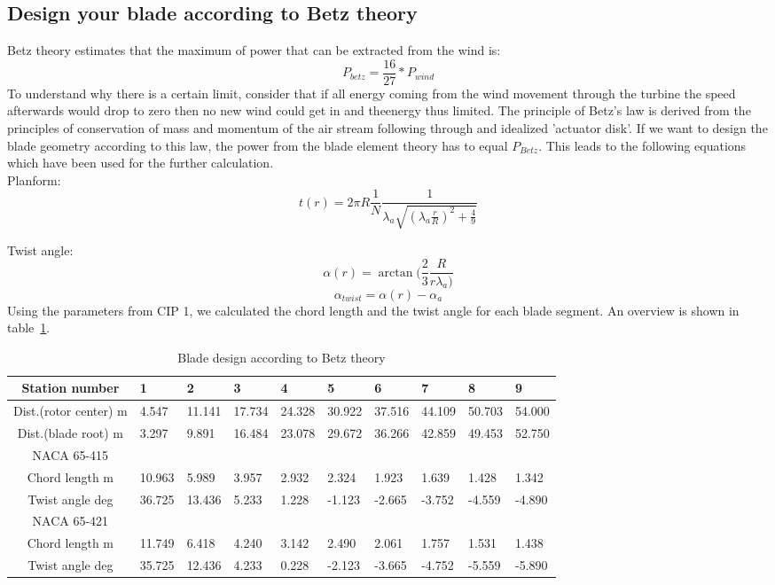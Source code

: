 \documentclass[10pt]{article}
\begin{document}
\subsection{Design your blade according to Betz theory}
Betz theory estimates that the maximum of power that can be extracted from the wind is:
\begin{equation}
P_{betz} = \frac{16}{27}*P_{wind}
\end{equation}
To understand why there is a certain limit, consider that if all energy coming from the wind movement through the turbine the speed afterwards would drop to zero then no new wind could get in and theenergy thus limited.
The principle of Betz's law is derived from the principles of conservation of mass and momentum of the air stream following through and idealized 'actuator disk'.
If we want to design the blade geometry according to this law, the power from the blade element theory has to equal $P_{Betz}$. This leads to the following equations which have been used for the further calculation.\\

Planform:
\begin{equation}
t(r) = 2\pi R \frac{1}{N}\frac{1}{\lambda_a\sqrt{(\lambda_a\frac{r}{R})^2+\frac{4}{9}}}
\end{equation}

Twist angle:
\begin{equation}
\alpha(r) = \arctan(\frac{2}{3}\frac{R}{r\lambda_a)}
\end{equation}
\begin{equation}
\alpha_{twist} = \alpha(r) - \alpha_a
\end{equation}
Using the parameters from CIP 1, we calculated the chord length and the twist angle for each blade segment. An overview is shown in table~\ref{blade_design_betz}.
\begin{table}[H]
\begin{tabular}{c| l l l l l l l l l}
\hline
Station number & 	1&	2&	3	&4	&5	&6	&7	&8	&9\\
\hline
Dist.(rotor center)	m&	4.547&	11.141&	17.734&	24.328&	30.922&	37.516&	44.109&	50.703&	54.000\\
Dist.(blade root)	m&	3.297&	9.891&	16.484&	23.078&	29.672&	36.266&	42.859&	49.453&	52.750\\
\hline
NACA 65-415\\
\hline
Chord length	m&		10.963&	5.989&	3.957&	2.932	&2.324&	1.923&	1.639&	1.428&	1.342\\
Twist angle	deg	&	36.725	&13.436&	5.233&	1.228&	-1.123&	-2.665&	-3.752	&-4.559&	-4.890\\
\hline
NACA 65-421\\
\hline
Chord length	m	&	11.749&	6.418	&4.240&	3.142&	2.490&	2.061	&1.757&	1.531&	1.438
\\
Twist angle	deg	&	35.725&	12.436&	4.233&	0.228	&-2.123&	-3.665	&-4.752&	-5.559	&-5.890\\
\hline
\end{tabular}
\caption{Blade design according to Betz theory}
\label{blade_design_betz}
\end{table}
\end{document}
